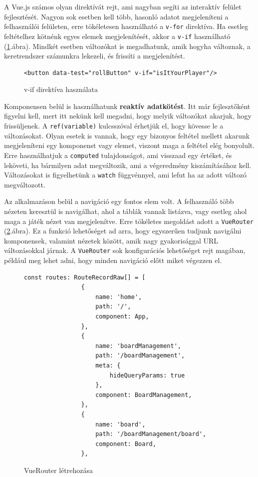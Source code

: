 \documentclass[a4paper,twoside]{article}
\begin{document}
A Vue.js számos olyan direktívát rejt, ami nagyban segíti az interaktív felület fejlesztését. Nagyon sok esetben kell több, hasonló adatot megjeleníteni a felhasználói felületen, erre tökéletesen használható a \verb|v-for| direktíva. Ha esetleg feltételhez kötnénk egyes elemek megjelenítését, akkor a \verb|v-if| használható (\ref{v-if}.ábra). Mindkét esetben változókat is megadhatunk, amik hogyha változnak, a keretrendszer számunkra lekezeli, és frissíti a megjelenítést.  

\begin{figure}
	\caption{v-if direktíva használata}
	
	\begin{minipage}{\textwidth}
		\begin{lstlisting}[style=javascriptStyle]
			<button data-test="rollButton" v-if="isItYourPlayer"/>
		\end{lstlisting}
	\end{minipage}
	
	\label{v-if}
\end{figure}

Komponensen belül is használhatunk \textbf{reaktív adatkötést}. Itt már fejlesztőként figyelni kell, mert itt nekünk kell megadni, hogy melyik változókat akarjuk, hogy frissüljenek. A \verb|ref(variable)| kulcsszóval érhetjük el, hogy kövesse le a változásokat. Olyan esetek is vannak, hogy egy bizonyos feltétel mellett akarunk megjeleníteni egy komponenst vagy elemet, viszont maga a feltétel elég bonyolult. Erre használhatjuk a \verb|computed| tulajdonságot, ami visszaad egy értéket, és leköveti, ha bármilyen adat megváltozik, ami a végeredmény kiszámításához kell. Változásokat is figyelhetünk a \verb|watch| függvénnyel, ami lefut ha az adott változó megváltozott. 

Az alkalmazáson belül a navigáció egy fontos elem volt. A felhasználó több nézeten keresztül is navigálhat, ahol a táblák vannak listázva, vagy esetleg ahol maga a játék nézet van megjelenítve. Erre tökéletes megoldást adott a \verb|VueRouter| (\ref{vuerouter}.ábra). Ez a funkció lehetőséget ad arra, hogy egyszerűen tudjunk navigálni komponensek, valamint nézetek között, amik nagy gyakorisággal URL változásokkal járnak. A \verb|VueRouter| sok konfigurációs lehetőséget rejt magában, például meg lehet adni, hogy minden navigáció előtt miket végezzen el. 
\begin{figure}
	\caption{VueRouter létrehozása}
	
		\begin{minipage}{\textwidth}
			\begin{lstlisting}[style=javascriptStyle]
				const routes: RouteRecordRaw[] = [
				{
					name: 'home',
					path: '/',
					component: App,
				},
				{
					name: 'boardManagement',
					path: '/boardManagement',
					meta: {
						hideQueryParams: true
					},
					component: BoardManagement,
				},
				{
					name: 'board',
					path: '/boardManagement/board',
					component: Board,
				},
			\end{lstlisting}
		\end{minipage}
	
	\label{vuerouter}
\end{figure}
\end{document}
